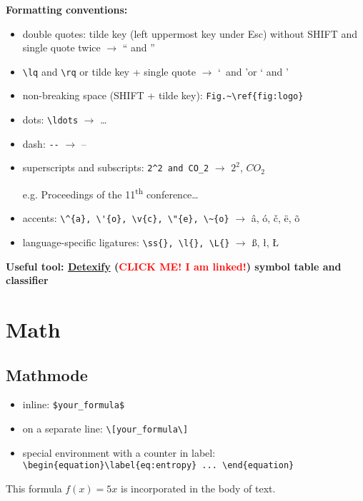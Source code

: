 \documentclass[a4paper,11pt,leqno]{article}
\begin{document}
\textbf{Formatting conventions:}

\begin{itemize}
	\item double quotes: tilde key (left uppermost key under Esc) without SHIFT and single quote twice $\rightarrow$ `` and ''
	\item \verb|\lq| and \verb|\rq| or tilde key + single quote $\rightarrow$ \lq~and \rq or ` and '
	\item non-breaking space (SHIFT + tilde key): \verb|Fig.~\ref{fig:logo}|
	\item dots: \verb|\ldots| $\rightarrow$ \ldots
	\item dash: \verb|--| $\rightarrow$ --
	\item superscripts and subscripts: \verb|2^2 and CO_2| $\rightarrow$ $2^2$, $CO_2$
	
	e.g. Proceedings of the 11\textsuperscript{th} conference\ldots
	
	\item accents: \verb|\^{a}, \'{o}, \v{c}, \"{e}, \~{o}| $\rightarrow$ \^{a}, \'{o}, \v{c}, \"{e}, \~{o}
	\item language-specific ligatures: \verb|\ss{}, \l{}, \L{}| $\rightarrow$ \ss{}, \l{}, \L{}
\end{itemize}

\textbf{Useful tool: \href{http://detexify.kirelabs.org/symbols.html}{Detexify} (\textcolor{red}{CLICK ME! I am linked!}) symbol table and classifier}

\section{Math}

\subsection{Mathmode}

\begin{itemize}
	\item inline: \verb|$your_formula$|
	\item on a separate line: \verb|\[your_formula\]|
	\item special environment with a counter in label: \verb|\begin{equation}\label{eq:entropy} ... \end{equation}|
\end{itemize}

This formula $f(x)=5x$ is incorporated in the body of text. 
\end{document}
